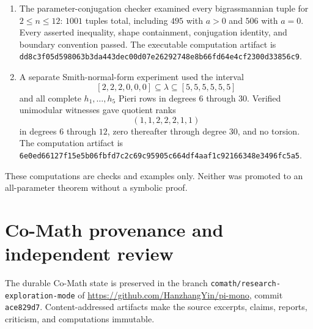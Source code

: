 \documentclass[11pt]{amsart}
\theoremstyle{definition}
\theoremstyle{remark}
\begin{document}
\begin{enumerate}[label=\arabic*.]
\item The parameter-conjugation checker examined every bigrassmannian tuple
for $2\leq n\leq12$: $1001$ tuples total, including $495$ with $a>0$ and
$506$ with $a=0$.  Every asserted inequality, shape containment, conjugation
identity, and boundary convention passed.  The executable computation
artifact is
\texttt{dd8c3f05d598063b3da443dec00d07e26292748e8b66fd64e4cf2300d33856c9}.

\item A separate Smith-normal-form experiment used the interval
\[
 [2,2,2,0,0,0]\subseteq\lambda\subseteq[5,5,5,5,5,5]
\]
and all complete $h_1,\ldots,h_5$ Pieri rows in degrees $6$ through $30$.
Verified unimodular witnesses gave quotient ranks
\[
 (1,1,2,2,2,1,1)
\]
in degrees $6$ through $12$, zero thereafter through degree $30$, and no
torsion.  The computation artifact is
\texttt{6e0ed66127f15e5b06fbfd7c2c69c95905c664df4aaf1c92166348e3496fc5a5}.
\end{enumerate}

These computations are checks and examples only.  Neither was promoted to an
all-parameter theorem without a symbolic proof.

\section{Co-Math provenance and independent review}

The durable Co-Math state is preserved in the branch
\texttt{comath/research-exploration-mode} of
\url{https://github.com/HanzhangYin/pi-mono}, commit
\texttt{ace829d7}.  Content-addressed artifacts make the source excerpts,
claims, reports, criticism, and computations immutable.
\end{document}
